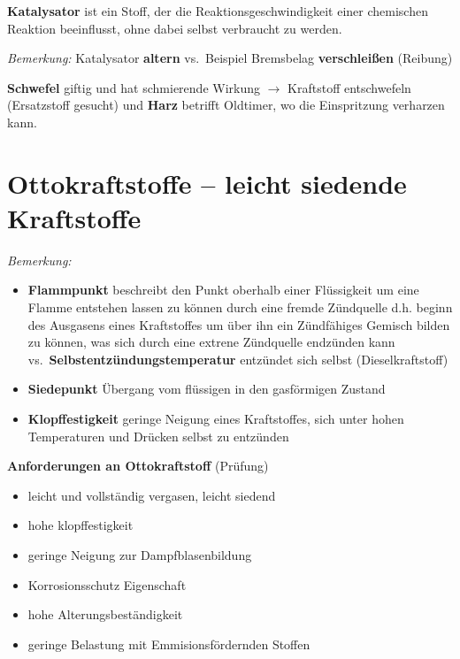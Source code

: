 \textbf{Katalysator} ist ein Stoff, der die Reaktionsgeschwindigkeit
einer chemischen Reaktion beeinflusst, ohne dabei selbst verbraucht zu
werden.

\emph{Bemerkung:} Katalysator \textbf{altern} vs.~Beispiel Bremsbelag
\textbf{verschleißen} (Reibung)

\textbf{Schwefel} giftig und hat schmierende Wirkung $\to$ Kraftstoff
entschwefeln (Ersatzstoff gesucht) und \textbf{Harz} betrifft Oldtimer,
wo die Einspritzung verharzen kann.

\section{Ottokraftstoffe -- leicht siedende
Kraftstoffe}\label{ottokraftstoffe-leicht-siedende-kraftstoffe}

\emph{Bemerkung:}

\begin{itemize}
\item
  \textbf{Flammpunkt} beschreibt den Punkt oberhalb einer Flüssigkeit um
  eine Flamme entstehen lassen zu können durch eine fremde Zündquelle
  d.h. beginn des Ausgasens eines Kraftstoffes um über ihn ein
  Zündfähiges Gemisch bilden zu können, was sich durch eine extrene
  Zündquelle endzünden kann vs.~\textbf{Selbstentzündungstemperatur}
  entzündet sich selbst (Dieselkraftstoff)
\item
  \textbf{Siedepunkt} Übergang vom flüssigen in den gasförmigen Zustand
\item
  \textbf{Klopffestigkeit} geringe Neigung eines Kraftstoffes, sich
  unter hohen Temperaturen und Drücken selbst zu entzünden
\end{itemize}

\textbf{Anforderungen an Ottokraftstoff} (Prüfung)

\begin{itemize}
\item
  leicht und vollständig vergasen, leicht siedend
\item
  hohe klopffestigkeit
\item
  geringe Neigung zur Dampfblasenbildung
\item
  Korrosionsschutz Eigenschaft
\item
  hohe Alterungsbeständigkeit
\item
  geringe Belastung mit Emmisionsfördernden Stoffen
\end{itemize}

